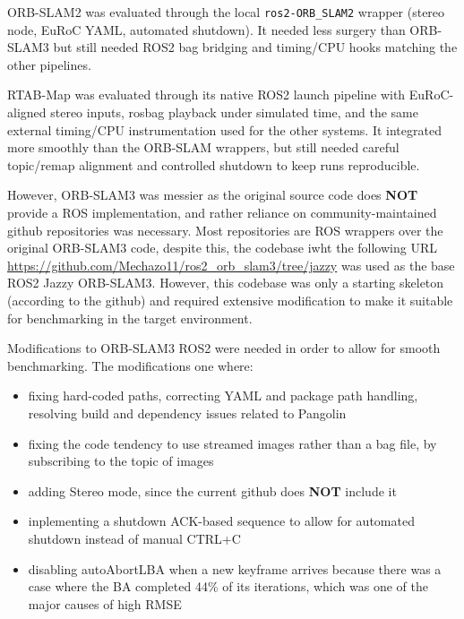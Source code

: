 \documentclass[11pt]{article}
\begin{document}
ORB-SLAM2 was evaluated through the local \texttt{ros2-ORB\_SLAM2} wrapper (stereo node, EuRoC YAML, automated shutdown). It needed less surgery than ORB-SLAM3 but still needed ROS2 bag bridging and timing/CPU hooks matching the other pipelines.

RTAB-Map was evaluated through its native ROS2 launch pipeline with EuRoC-aligned stereo inputs, rosbag playback under simulated time, and the same external timing/CPU instrumentation used for the other systems. It integrated more smoothly than the ORB-SLAM wrappers, but still needed careful topic/remap alignment and controlled shutdown to keep runs reproducible.

However, ORB-SLAM3 was messier as the original source code does \textbf{NOT} provide a ROS implementation, and rather reliance on community-maintained github repositories was necessary. Most repositories are ROS wrappers over the original ORB-SLAM3 code, despite this, the codebase iwht the following URL \url{https://github.com/Mechazo11/ros2_orb_slam3/tree/jazzy} was used as the base ROS2 Jazzy ORB-SLAM3. However, this codebase was only a starting skeleton (according to the github) and required extensive modification to make it suitable for benchmarking in the target environment.

Modifications to ORB-SLAM3 ROS2 were needed in order to allow for smooth benchmarking.
The modifications one where:
\begin{itemize}
    \item fixing hard-coded paths, correcting YAML and package path handling, resolving build and dependency issues related to Pangolin
    \item fixing the code tendency to use streamed images rather than a bag file, by subscribing to the topic of images
    \item adding Stereo mode, since the current github does \textbf{NOT} include it
    \item inplementing a shutdown ACK-based sequence to allow for automated shutdown instead of manual CTRL+C
    \item disabling autoAbortLBA when a new keyframe arrives because there was a case where the BA completed 44\% of its iterations, which was one of the major causes of high RMSE
\end{itemize}
\end{document}
